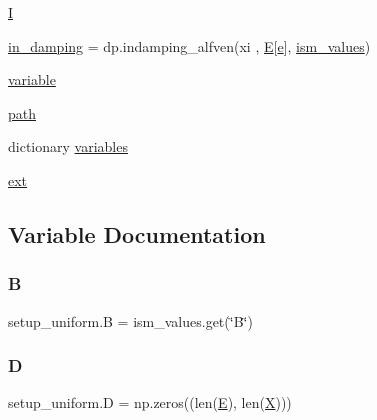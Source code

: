 \begin{DoxyCompactItemize}
\item 
\hyperlink{namespacesetup__uniform_a3417d7bb0276f50626b6893f5ee95051}{I}
\item 
\hyperlink{namespacesetup__uniform_a61670f1e4db542f37be0aecf2966d034}{in\+\_\+damping} = dp.\+indamping\+\_\+alfven(xi , \hyperlink{namespacesetup__uniform_a05accd2e8ab1c28d2f58f024c9a64fac}{E}\mbox{[}\hyperlink{constants_8h_a2b076531cd50c7b55702a53221f2ac72}{e}\mbox{]}, \hyperlink{namespacesetup__uniform_a34870362e4309cb440bb19768f5e5337}{ism\+\_\+values})
\item 
\hyperlink{namespacesetup__uniform_afb738a335e6dae71edbe4023b5333cad}{variable}
\item 
\hyperlink{namespacesetup__uniform_a2a320d2464e99d040b5963c189c187d4}{path}
\item 
dictionary \hyperlink{namespacesetup__uniform_a042a09faa075440d09cca9aa98979c31}{variables}
\item 
\hyperlink{namespacesetup__uniform_a4db2f3dc20837fb505582ea74cf06bdf}{ext}
\end{DoxyCompactItemize}


\subsection{Variable Documentation}
\mbox{\label{namespacesetup__uniform_a36f3bd90798861dc5dc40b647504e9ad}} 
\subsubsection{\texorpdfstring{B}{B}}
{\footnotesize\ttfamily setup\+\_\+uniform.\+B = ism\+\_\+values.\+get(\char`\"{}B\char`\"{})}

\mbox{\label{namespacesetup__uniform_a3a05db90aba04dff74903a7893d970bd}} 
\subsubsection{\texorpdfstring{D}{D}}
{\footnotesize\ttfamily setup\+\_\+uniform.\+D = np.\+zeros((len(\hyperlink{namespacesetup__uniform_a05accd2e8ab1c28d2f58f024c9a64fac}{E}), len(\hyperlink{namespacesetup__uniform_a6d0e53624e475055c31146a2ff8d762c}{X})))}

